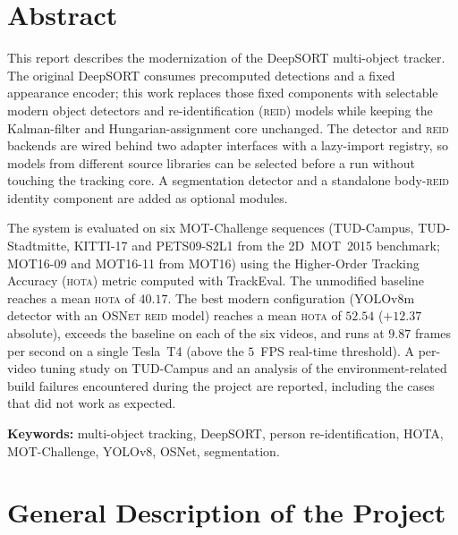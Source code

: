 \documentclass[12pt, a4paper]{article}
\newcommand{\hota}{\textsc{hota}}
\newcommand{\osnet}{\textsc{OSNet}}
\newcommand{\reid}{\textsc{reid}}
\begin{document}
\newpage
\tableofcontents
\newpage

\section*{Abstract}

This report describes the modernization of the DeepSORT multi-object tracker. The original
DeepSORT consumes precomputed detections and a fixed appearance encoder; this work replaces those
fixed components with selectable modern object detectors and re-identification (\reid{}) models while
keeping the Kalman-filter and Hungarian-assignment core unchanged. The detector and \reid{} backends
are wired behind two adapter interfaces with a lazy-import registry, so models from different source
libraries can be selected before a run without touching the tracking core. A segmentation detector
and a standalone body-\reid{} identity component are added as optional modules.

The system is evaluated on six MOT-Challenge sequences (TUD-Campus, TUD-Stadtmitte, KITTI-17 and
PETS09-S2L1 from the 2D~MOT~2015 benchmark; MOT16-09 and MOT16-11 from MOT16) using the
Higher-Order Tracking Accuracy (\hota{}) metric computed with TrackEval. The unmodified baseline
reaches a mean \hota{} of $40.17$. The best modern configuration (YOLOv8m detector with an \osnet{}
\reid{} model) reaches a mean \hota{} of $52.54$ ($+12.37$ absolute), exceeds the baseline on each of
the six videos, and runs at $9.87$ frames per second on a single Tesla~T4 (above the $5$~FPS
real-time threshold). A per-video tuning study on TUD-Campus and an analysis of the
environment-related build failures encountered during the project are reported, including the cases
that did not work as expected.

\textbf{Keywords:} multi-object tracking, DeepSORT, person re-identification, HOTA, MOT-Challenge,
YOLOv8, OSNet, segmentation.

\newpage

\section{General Description of the Project}
\label{sec:general}
\end{document}
